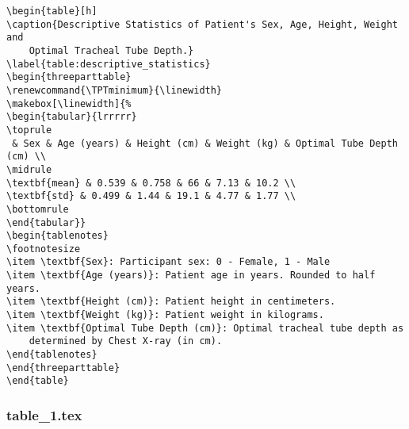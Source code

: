 \documentclass[11pt]{article}
\begin{document}
\begin{Verbatim}[tabsize=4]
\begin{table}[h]
\caption{Descriptive Statistics of Patient's Sex, Age, Height, Weight and
	Optimal Tracheal Tube Depth.}
\label{table:descriptive_statistics}
\begin{threeparttable}
\renewcommand{\TPTminimum}{\linewidth}
\makebox[\linewidth]{%
\begin{tabular}{lrrrrr}
\toprule
 & Sex & Age (years) & Height (cm) & Weight (kg) & Optimal Tube Depth (cm) \\
\midrule
\textbf{mean} & 0.539 & 0.758 & 66 & 7.13 & 10.2 \\
\textbf{std} & 0.499 & 1.44 & 19.1 & 4.77 & 1.77 \\
\bottomrule
\end{tabular}}
\begin{tablenotes}
\footnotesize
\item \textbf{Sex}: Participant sex: 0 - Female, 1 - Male
\item \textbf{Age (years)}: Patient age in years. Rounded to half years.
\item \textbf{Height (cm)}: Patient height in centimeters.
\item \textbf{Weight (kg)}: Patient weight in kilograms.
\item \textbf{Optimal Tube Depth (cm)}: Optimal tracheal tube depth as
	determined by Chest X-ray (in cm).
\end{tablenotes}
\end{threeparttable}
\end{table}

\end{Verbatim}

\subsubsection*{table\_1.tex}
\end{document}
